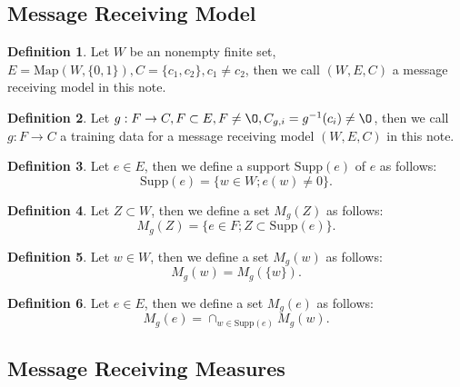 \documentclass[11pt, a4note]{article}
\theoremstyle{definition}
\newtheorem{definition}{Definition}[section]
\begin{document}
\subsection{Message Receiving Model}

\begin{definition}
Let $ W $ be an nonempty finite set, $ E = \mathrm{Map}(W, \{0, 1\}), C = \{c_{1}, c_{2} \}, c_{1} \ne c_{2} $,
then we call $ (W, E, C) $ a message receiving model in this note.
\end{definition}

\begin{definition}
Let $ g : F \to C, F \subset E, F \ne \O, C_{g,i} = g^{-1}(c_{i}) \ne \O $, then we call $ g : F \to C $
a training data for a message receiving model $ (W, E, C) $ in this note.
\end{definition}

\begin{definition}
Let $ e \in E $, then we define a support $ \mathrm{Supp}(e) $ of $ e $ as follows:
\begin{equation}
\mathrm{Supp}(e) = \{ w \in W ; e(w) \ne 0\}.
\end{equation}
\end{definition}

\begin{definition}
Let $ Z \subset W $, then we define a set $ M_{g}(Z) $ as follows:
\begin{equation}
M_{g}(Z) = \{e \in F ; Z \subset \mathrm{Supp}(e)\}.
\end{equation}
\end{definition}

\begin{definition}
Let $ w \in W $, then we define a set $ M_{g}(w) $ as follows:
\begin{equation}
M_{g}(w) = M_{g}(\{w\}).
\end{equation}
\end{definition}

\begin{definition}
Let $ e \in E $, then we define a set $ M_{g}(e) $ as follows:
\begin{equation}
M_{g}(e) = \cap_{w \in \mathrm{Supp}(e)}M_{g}(w).
\end{equation}
\end{definition}

\subsection{Message Receiving Measures}
\end{document}
